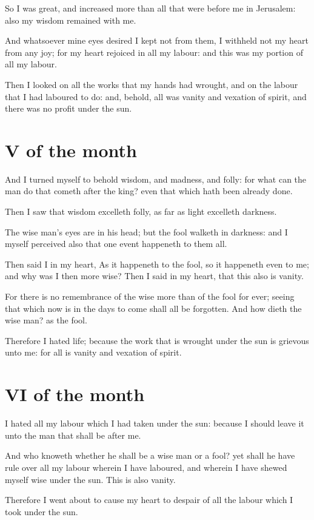 So I was great, and increased more than all that were before me in Jerusalem: also my wisdom remained with me.

And whatsoever mine eyes desired I kept not from them, I withheld not my heart from any joy; for my heart rejoiced in all my labour: and this was my portion of all my labour.

Then I looked on all the works that my hands had wrought, and on the labour that I had laboured to do: and, behold, all was vanity and vexation of spirit, and there was no profit under the sun.

\section*{V of the month}

And I turned myself to behold wisdom, and madness, and folly: for what can the man do that cometh after the king? even that which hath been already done.

Then I saw that wisdom excelleth folly, as far as light excelleth darkness.

The wise man's eyes are in his head; but the fool walketh in darkness: and I myself perceived also that one event happeneth to them all.

Then said I in my heart, As it happeneth to the fool, so it happeneth even to me; and why was I then more wise? Then I said in my heart, that this also is vanity.

For there is no remembrance of the wise more than of the fool for ever; seeing that which now is in the days to come shall all be forgotten. And how dieth the wise man? as the fool.

Therefore I hated life; because the work that is wrought under the sun is grievous unto me: for all is vanity and vexation of spirit.

\section*{VI of the month}

 I hated all my labour which I had taken under the sun: because I should leave it unto the man that shall be after me.

And who knoweth whether he shall be a wise man or a fool? yet shall he have rule over all my labour wherein I have laboured, and wherein I have shewed myself wise under the sun. This is also vanity.

Therefore I went about to cause my heart to despair of all the labour which I took under the sun.

